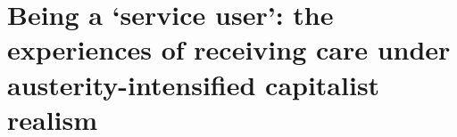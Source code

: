 


\section{Being a `service user':  the experiences of receiving care under austerity-intensified capitalist realism}

